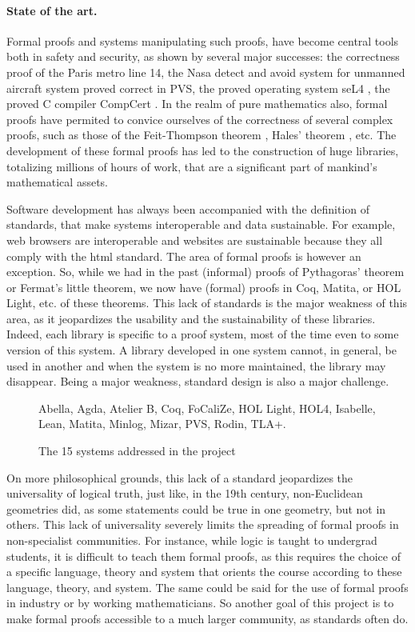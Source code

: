 \paragraph{State of the art.}
Formal proofs and systems manipulating such proofs, have become
central tools both in safety and security, as shown by several major
successes: the correctness proof of the Paris metro line 14, the Nasa
detect and avoid system for unmanned aircraft system proved correct in
PVS, the proved operating system seL4 \cite{Klein09}, the proved C
compiler CompCert \cite{Leroy06}.  In the realm of pure mathematics
also, formal proofs have permited to convice ourselves of the
correctness of several complex proofs, such as those of the Feit-Thompson
theorem \cite{Gonthier13}, Hales' theorem
\cite{Hales17}, etc.  The development of these formal proofs has led
to the construction of huge libraries, totalizing millions of hours of
work, that are a significant part of mankind's mathematical assets.

Software development has always been accompanied with the definition
of standards, that make systems interoperable and data
sustainable. For example, web browsers are interoperable and websites
are sustainable because they all comply with the html standard. The
area of formal proofs is however an exception. So, while we had in the
past (informal) proofs of Pythagoras' theorem or Fermat's little
theorem, we now have (formal) proofs in {\sc Coq}, {\sc Matita}, or
{\sc HOL Light}, etc. of these theorems. This lack of standards is
the major weakness of this area, as it jeopardizes the usability and
the sustainability of these libraries. Indeed, each library is
specific to a proof system, most of the time even to some version of
this system. A library developed in one system cannot, in general, be
used in another and when the system is no more maintained, the library
may disappear. Being a major weakness, standard design is also a major
challenge.

\begin{figure}
{\sc Abella}, 
{\sc Agda}, 
{\sc Atelier B}, 
{\sc Coq}, 
{\sc FoCaliZe}, 
{\sc HOL Light}, 
{\sc HOL4},
{\sc Isabelle},
{\sc Lean}, 
{\sc Matita}, 
{\sc Minlog}, 
{\sc Mizar}, 
{\sc PVS}, 
{\sc Rodin}, 
{\sc TLA+}.
\caption{The 15 systems addressed in the project}
\end{figure}

On more philosophical grounds, this lack of a standard jeopardizes the
universality of logical truth, just like, in the 19th century,
non-Euclidean geometries did, as some statements could be true in one
geometry, but not in others.  This lack of universality severely
limits the spreading of formal proofs in non-specialist
communities. For instance, while logic is taught to undergrad
students, it is difficult to teach them formal proofs, as this
requires the choice of a specific language, theory and system that
orients the course according to these language, theory, and
system. The same could be said for the use of formal proofs in
industry or by working mathematicians. So another goal of this project
is to make formal proofs accessible to a much larger community, as
standards often do.

